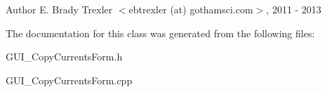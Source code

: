 \begin{DoxyAuthor}{Author}
E. Brady Trexler $<$ebtrexler (at) gothamsci.\+com$>$, 2011 -\/ 2013 
\end{DoxyAuthor}


The documentation for this class was generated from the following files\+:\begin{DoxyCompactItemize}
\item 
G\+U\+I\+\_\+\+Copy\+Currents\+Form.\+h\item 
G\+U\+I\+\_\+\+Copy\+Currents\+Form.\+cpp\end{DoxyCompactItemize}
